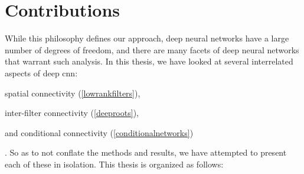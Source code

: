 \documentclass[thesis]{subfiles}
\begin{document}
\section{Contributions}
While this philosophy defines our approach, deep neural networks have a large number of degrees of freedom, and there are many facets of deep neural networks that warrant such analysis. In this thesis, we have looked at several interrelated aspects of deep \gls{cnn}:
\begin{enumerate*}[label=(\textbf{\roman*)}]
\item spatial connectivity (\cref{lowrankfilters}),
\item inter-filter connectivity (\cref{deeproots}),
\item and conditional connectivity (\cref{conditionalnetworks})
\end{enumerate*}.
So as to not conflate the methods and results, we have attempted to present each of these in isolation. 
This thesis is organized as follows:
\end{document}
